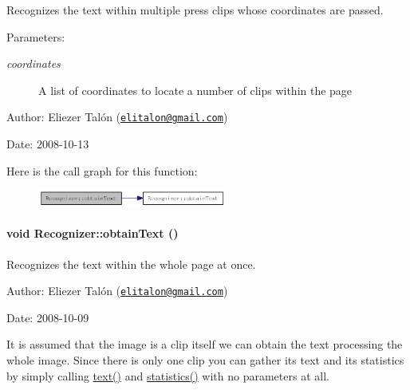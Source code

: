 Recognizes the text within multiple press clips whose coordinates are passed. 

\begin{Desc}
\item[Parameters:]
\begin{description}
\item[{\em coordinates}]A list of coordinates to locate a number of clips within the page\end{description}
\end{Desc}
\begin{Desc}
\item[Author:]Eliezer Talón (\href{mailto:elitalon@gmail.com}{\tt elitalon@gmail.com}) \end{Desc}
\begin{Desc}
\item[Date:]2008-10-13 \end{Desc}


Here is the call graph for this function:\nopagebreak
\begin{figure}[H]
\begin{center}
\leavevmode
\includegraphics[width=176pt]{class_recognizer_4b3b27b3746edcf831d142eddfb81f19_cgraph}
\end{center}
\end{figure}
\hypertarget{class_recognizer_008a0ea69a912ff54882dd20d18adcf9}{
\paragraph[{obtainText}]{\setlength{\rightskip}{0pt plus 5cm}void Recognizer::obtainText ()}\hfill}
\label{class_recognizer_008a0ea69a912ff54882dd20d18adcf9}


Recognizes the text within the whole page at once. 

\begin{Desc}
\item[Author:]Eliezer Talón (\href{mailto:elitalon@gmail.com}{\tt elitalon@gmail.com}) \end{Desc}
\begin{Desc}
\item[Date:]2008-10-09\end{Desc}
It is assumed that the image is a clip itself we can obtain the text processing the whole image. Since there is only one clip you can gather its text and its statistics by simply calling \hyperlink{class_recognizer_c5d20b511888a60a6c1a81c0a4206ec2}{text()} and \hyperlink{class_recognizer_8b38356d2741969e67cd6b4f507897ba}{statistics()} with no parameters at all. 

